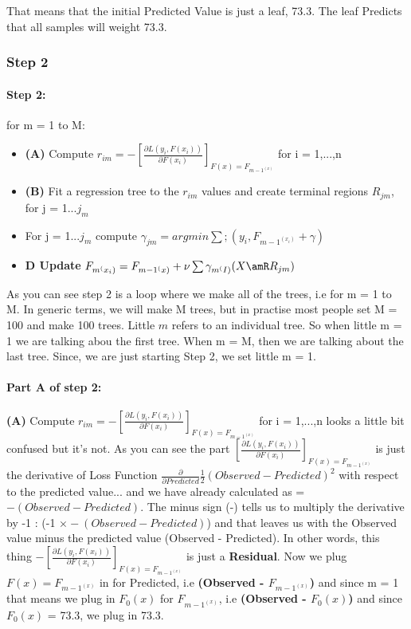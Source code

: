 \documentclass[12pt, a4paper]{article} %
\begin{document}
That means that the initial Predicted Value is just a  leaf, 73.3. The leaf Predicts that all samples will weight 73.3.

\subsubsection{Step 2}

\paragraph{Step 2:} for m = 1 to M:

\begin{itemize}
    \item \textbf{(A)} Compute $r_{im} = -[\frac{\partial L(y_{i}, F(x_{i}))}{\partial F(x_{i})}]_{F(x) = F_{m - 1^(x)}}$ for i = 1,...,n
    
    \item \textbf{(B)} Fit a regression tree to the $r_{im}$ values and create terminal regions $R_{jm}$, for j = 1...$j_{m}$
    
    \item For j = 1...$j_{m}$ compute $\gamma_{jm} = argmin \sum ;(y_{i}, F_{m - 1^(x_{i})} + \gamma)$
    
    \item \textbf{D Update} $F_{m^(x_{i})} = F_{m -1^(x)} + \nu \sum \gamma_{m^(I)}(X \amR R_{jm})$
\end{itemize}

As you can see step 2 is a loop where we make all of the trees, i.e for m = 1 to M. In generic terms, we will make M trees, but in practise most people set M = 100 and make 100 trees. Little $m$ refers to an individual tree. So when little m = 1 we are talking abou the first tree. When m = M, then we are talking about the last tree. Since, we are just starting Step 2, we set little m = 1.

\paragraph{Part A of step 2:} \textbf{(A)} Compute $r_{im} = -[\frac{\partial L(y_{i}, F(x_{i}))}{\partial F(x_{i})}]_{F(x) = F_{m - 1^(x)}}$ for i = 1,...,n looks a little bit confused but it's not. As you can see the part $[\frac{\partial L(y_{i}, F(x_{i}))}{\partial F(x_{i})}]_{F(x) =  F_{m - 1^(x)}}$ is just the derivative of Loss Function $\frac{\partial}{\partial Predicted}\frac{1}{2}(Observed - Predicted)^2$ with respect to the predicted value... and we have already calculated as = $-(Observed - Predicted)$. The minus sign (-) tells us to multiply the derivative by -1 : (-1 $\times -(Observed - Predicted)$) and that leaves us with the Observed value minus the predicted value (Observed - Predicted). In other words, this thing $-[\frac{\partial L(y_{i}, F(x_{i}))}{\partial F(x_{i})}]_{F(x) = F_{m - 1^(x)}}$ is just a \textbf{Residual}. Now we plug $F(x) =  F_{m - 1^(x)}$ in for Predicted, i.e \textbf{(Observed - $F_{m - 1^(x)}$)} and since m = 1 that means we plug in $F_{0}(x)$ for $F_{m - 1^(x)}$, i.e \textbf{(Observed - $F_{0}(x)$)} and since $F_{0}(x)$ = 73.3, we plug in 73.3.
\newline
\end{document}
